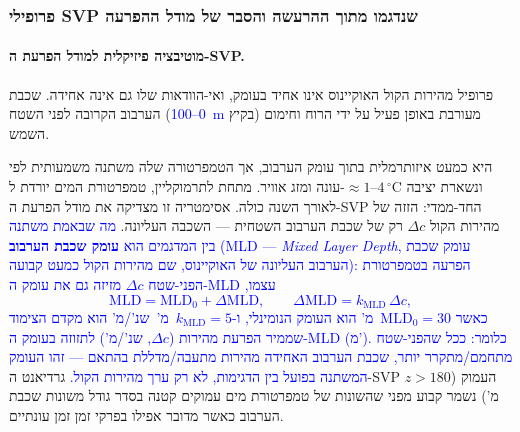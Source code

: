 \documentclass[12pt,a4paper]{article}
\DeclareRobustCommand{\aiedit}[1]{\textcolor{blue}{#1}}
\begin{document}
\subsubsection{פרופילי SVP שנדגמו מתוך ההרעשה והסבר של מודל ההפרעה}
\label{sec:svp_ensemble}

\paragraph{מוטיבציה פיזיקלית למודל הפרעת ה-SVP.}
פרופיל מהירות הקול האוקיינוס אינו אחיד בעומק, ואי-הוודאות שלו גם אינה אחידה.
שכבת הערבוב הקרובה לפני השטח (\aiedit{\textenglish{0--100~m}} בקיץ) מעורבת באופן פעיל על ידי הרוח וחימום השמש.%

היא כמעט איזותרמלית בתוך עומק הערבוב, אך הטמפרטורה שלה משתנה משמעותית לפי עונה ומזג אוויר.
מתחת לתרמוקליין, טמפרטורת המים יורדת ל-$\approx 1$--$4\,^\circ$C
ונשארת יציבה לאורך השנה כולה.
אסימטריה זו מצדיקה את מודל הפרעת ה-SVP החד-ממדי: הזזה של מהירות הקול $\Delta c$
רק של שכבת הערבוב השטחית — השכבה העליונה.
\aiedit{מה שבאמת משתנה בין המדגמים הוא \textbf{עומק שכבת הערבוב} (\textenglish{MLD} —
\textit{Mixed Layer Depth}, עומק שכבת הערבוב העליונה של האוקיינוס, שם מהירות הקול כמעט
קבועה): הפרעה בטמפרטורת הפני-שטח $\Delta c$ מזיזה גם את עומק ה-MLD עצמו,
\[
  \mathrm{MLD} = \mathrm{MLD}_0 + \Delta\mathrm{MLD}, \qquad
  \Delta\mathrm{MLD} = k_{\mathrm{MLD}}\,\Delta c,
\]
כאשר $\mathrm{MLD}_0 = 30$~מ' הוא העומק הנומינלי, ו-$k_{\mathrm{MLD}} = 5$~מ'~שנ'/מ' הוא מקדם
הצימוד שממיר הפרעת מהירות ($\Delta c$, שנ'/מ') לתזוזה בעומק ה-MLD (מ').
כלומר: ככל שהפני-שטח מתחמם/מתקרר יותר, שכבת הערבוב האחידה מהירות מתעבה/מדללת בהתאם —
זהו העומק המשתנה בפועל בין הדגימות, לא רק ערך מהירות הקול.}
גרדיאנט ה-SVP העמוק ($z > 180$~מ') נשמר קבוע מפני שהשונות של טמפרטורת מים עמוקים
קטנה בסדר גודל משונות שכבת הערבוב כאשר מדובר אפילו בפרקי זמן זמן עונתיים.
\end{document}
